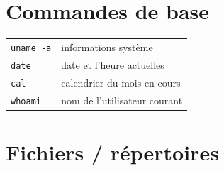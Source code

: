 \documentclass[10pt]{article}
\begin{document}
\begin{multicols}{4}
\section*{Commandes de base}
\begin{tabularx}{\columnwidth}{l|X}
  \lstinline|uname -a| & informations système \\
  \lstinline|date|     & date et l'heure actuelles \\
  \lstinline|cal|      & calendrier du mois en cours \\
  \lstinline|whoami|   & nom de l'utilisateur courant \\
\end{tabularx}

\section*{Fichiers / répertoires}


\end{multicols}
\end{document}
